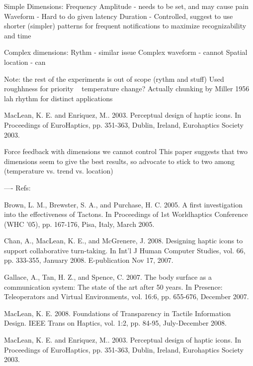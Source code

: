 Simple Dimensions:
Frequency
Amplitude - needs to be set, and may cause pain
Waveform - Hard to do given latency
Duration - Controlled, suggest to use shorter (simpler) patterns for frequent notifications to maximize recognizability and time

Complex dimensions:
Rythm - similar issue
Complex waveform - cannot
Spatial location - can

Note: the rest of the experiments is out of scope (rythm and stuff)
Used roughhness for priority ~ temperature change?
Actually chunking by Miller 1956 lah
rhythm for distinct applications


MacLean, K. E. and Enriquez, M.. 2003. Perceptual design of haptic icons. In Proceedings of EuroHaptics, pp. 351-363, Dublin, Ireland, Eurohaptics Society 2003.

Force feedback with dimensions we cannot control
This paper suggests that two dimensions seem to give the best results, so advocate to stick to two among (temperature vs. trend vs. location)


----
Refs:

Brown, L. M., Brewster, S. A., and Purchase, H. C. 2005. A first investigation into the effectiveness of Tactons. In Proceedings of 1st Worldhaptics Conference (WHC '05), pp. 167-176, Pisa, Italy, March 2005.

Chan, A., MacLean, K. E., and McGrenere, J. 2008. Designing haptic icons to support collaborative turn-taking. In Int'l J Human Computer Studies, vol. 66, pp. 333-355, January 2008. E-publication Nov 17, 2007.

Gallace, A., Tan, H. Z., and Spence, C. 2007. The body surface as a communication system: The state of the art after 50 years. In Presence: Teleoperators and Virtual Environments, vol. 16:6, pp. 655-676, December 2007.

MacLean, K. E. 2008. Foundations of Transparency in Tactile Information Design. IEEE Trans on Haptics, vol. 1:2, pp. 84-95, July-December 2008.

MacLean, K. E. and Enriquez, M.. 2003. Perceptual design of haptic icons. In Proceedings of EuroHaptics, pp. 351-363, Dublin, Ireland, Eurohaptics Society 2003.


